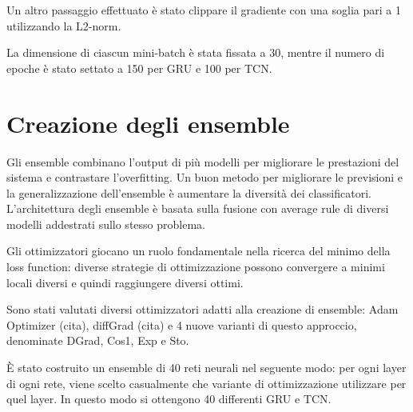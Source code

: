 Un altro passaggio effettuato è stato clippare il gradiente con una soglia pari a 1 utilizzando la L2-norm.

La dimensione di ciascun mini-batch è stata fissata a 30, mentre il numero di epoche è stato settato a 150 per GRU e 100 per TCN.

\section{Creazione degli ensemble}
Gli ensemble combinano l'output di più modelli per migliorare le prestazioni del sistema e contrastare l'overfitting. Un buon metodo per migliorare le previsioni e la generalizzazione dell'ensemble è aumentare la diversità dei classificatori. L'architettura degli ensemble è basata sulla fusione con average rule di diversi modelli addestrati sullo stesso problema. 

Gli ottimizzatori giocano un ruolo fondamentale nella ricerca del minimo della loss function: diverse strategie di ottimizzazione possono convergere a minimi locali diversi e quindi raggiungere diversi ottimi.

Sono stati valutati diversi ottimizzatori adatti alla creazione di ensemble: Adam Optimizer (cita), diffGrad (cita) e 4 nuove varianti di questo approccio, denominate DGrad, Cos1, Exp e Sto.

È stato costruito un ensemble di 40 reti neurali nel seguente modo: per ogni layer di ogni rete, viene scelto casualmente che variante di ottimizzazione utilizzare per quel layer. In questo modo si ottengono 40 differenti GRU e TCN.
